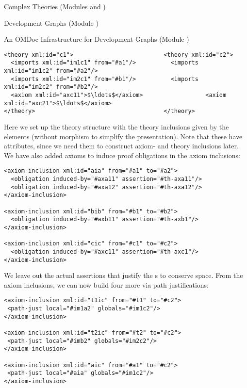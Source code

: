\begin{tchapter}[id=complex-theories,short=Complex Theories]{Complex Theories (Modules
    {} and {})}
\begin{tsection}[id=development-graphs,short=Development Graphs]{Development Graphs
    (Module {})}
\begin{tsubsection}[id=dg-omdoc,short=OMDoc Development Graphs]{An OMDoc Infrastructure
    for Development Graphs (Module {})}
\begin{lstlisting}[label=lst:thi,mathescape,
                   index={theory,imports,axiom},
                   caption={The {\omdoc} representation of the theories
                   in {\myfigref{thi-proof}}.}]
<theory xml:id="c1">                          <theory xml:id="c2">
  <imports xml:id="im1c1" from="#a1"/>          <imports xml:id="im1c2" from="#a2"/>
  <imports xml:id="im2c1" from="#b1"/>          <imports xml:id="im2c2" from="#b2"/>
  <axiom xml:id="axc11">$\ldots$</axiom>                  <axiom xml:id="axc21">$\ldots$</axiom>
</theory>                                     </theory>
\end{lstlisting}
Here we set up the theory structure with the theory inclusions given by the
{} elements (without morphism to simplify the presentation). Note
that these have {} attributes, since we need them to
construct axiom- and theory inclusions later. We have also added axioms to induce
proof obligations in the axiom inclusions:
\begin{lstlisting}[label=lst:thi-inclusions,
                   index={obligation,axiom-inclusion},
                   caption={The {\omdoc} Representation of the Inclusions
                   in {\myfigref{thi-proof}}.}]
<axiom-inclusion xml:id="aia" from="#a1" to="#a2">
  <obligation induced-by="#axa11" assertion="#th-axa11"/>
  <obligation induced-by="#axa12" assertion="#th-axa12"/>
</axiom-inclusion>

<axiom-inclusion xml:id="bib" from="#b1" to="#b2"> 
  <obligation induced-by="#axb11" assertion="#th-axb1"/>
</axiom-inclusion>

<axiom-inclusion xml:id="cic" from="#c1" to="#c2">
  <obligation induced-by="#axc11" assertion="#th-axc1"/>
</axiom-inclusion>
\end{lstlisting}
We leave out the actual assertions that justify the {s} to conserve
space. From the axiom inclusions, we can now build four more via path justifications:

\begin{lstlisting}[label=lst:thi-induced-inclusions,index={path-just,axiom-inclusion},
                   caption={The Induced Axiom Inclusions in {\myfigref{thi-proof}}.}]
<axiom-inclusion xml:id="t1ic" from="#t1" to="#c2">
 <path-just local="#im1a2" globals="#im1c2"/>
</axiom-inclusion>

<axiom-inclusion xml:id="t2ic" from="#t2" to="#c2">
 <path-just local="#imb2" globals="#im2c2"/>
</axiom-inclusion>

<axiom-inclusion xml:id="aic" from="#a1" to="#c2">
 <path-just local="#aia" globals="#im1c2"/>
</axiom-inclusion>


\end{lstlisting}
\end{tsubsection}
\end{tsection}
\end{tchapter}
